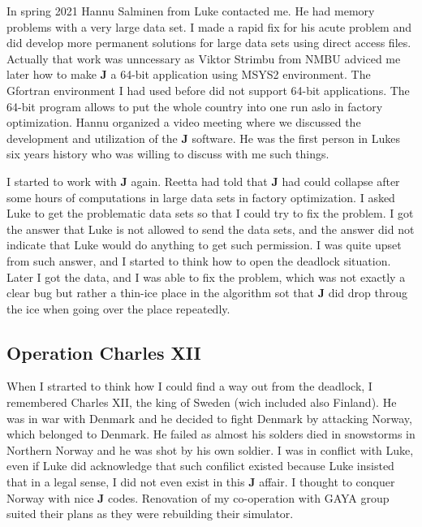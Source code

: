 In spring 2021 Hannu Salminen from Luke contacted me. He had memory
problems with a very large data set. I made a rapid fix for his acute
problem and did develop
more permanent solutions for large data sets using direct access files.
Actually that work was
unncessary as Viktor Strimbu from  NMBU  adviced me later how to make
\textbf{J} a 64-bit
application using MSYS2 environment. The Gfortran environment I had
used before did not
support 64-bit applications. The 64-bit program allows to put the whole country
into one run aslo in factory optimization. Hannu organized a video
meeting where we discussed the
development and utilization of the \textbf{J} software. He was the first person
in Lukes six years history who
was willing to discuss with me such things.

I started to work with \textbf{J} again. Reetta had told that \textbf{J} had could
collapse after some hours of computations in  large data sets in factory optimization.
I asked Luke to get the problematic
data sets so that I could try to fix the problem. I got the answer that Luke is not allowed to send the
data sets, and the answer did  not indicate
that Luke would do anything to get such permission.
I was quite upset from such answer,
and I started to think how to open the deadlock situation. Later I got the data,
and I was able to fix the problem, which was not exactly
a clear bug but rather a thin-ice place in the algorithm sot that \textbf{J} did drop
throug the ice when going over the place repeatedly.
\subsection{Operation Charles XII}
\label{preface6}
When I strarted to think how I could find a way out from the deadlock,
I remembered Charles XII,
the king of Sweden (wich included  also Finland). He was in war with Denmark
and he decided to fight Denmark by attacking Norway, which belonged to Denmark.
He failed as almost his solders died in snowstorms
in Northern Norway and he was shot by his own soldier.
I was in conflict with Luke, even if Luke did
acknowledge that such confilict existed
because Luke insisted that in a legal sense,
I did not even exist in this \textbf{J} affair.
I thought to conquer Norway with nice \textbf{J} codes.
Renovation of my co-operation with GAYA group
suited their plans as they were rebuilding their simulator.

